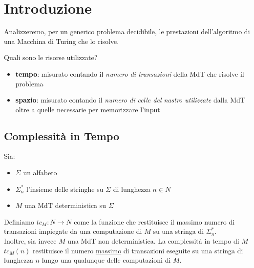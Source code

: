 \section{Introduzione}

Analizzeremo, per un generico problema decidibile, le prestazioni dell'algoritmo di una Macchina di Turing che lo risolve.

Quali sono le risorse utilizzate?

\begin{itemize}

	\item \textbf{tempo}: misurato contando il \textit{numero di transazioni} della MdT che risolve il problema

	\item \textbf{spazio}: misurato contando il \textit{numero di celle del nastro utilizzate} dalla MdT oltre a quelle necessarie per memorizzare l'input

\end{itemize}

\subsection{Complessità in Tempo}

Sia:
\begin{itemize}
	\item $\Sigma$ un alfabeto
	\item $\Sigma_n^\ast$ l'insieme delle stringhe su $\Sigma$ di lunghezza $n \in N$
	\item $M$ una MdT deterministica su $\Sigma$
\end{itemize}

Definiamo $tc_M : N \rightarrow N$ come la funzione che restituisce il massimo numero di transazioni impiegate da una computazione di $M$ su una stringa di $\Sigma_n^\ast$. \\

Inoltre, sia invece $M$ una MdT non deterministica. La complessità in tempo di $M$ $tc_M(n)$ restituisce il numero \underline{massimo} di transazioni eseguite su una stringa di lunghezza $n$ lungo una qualunque delle computazioni di $M$.
